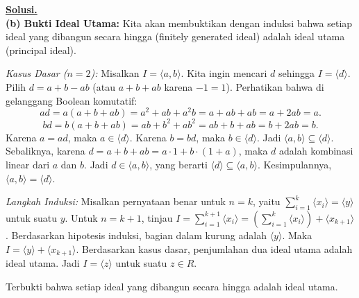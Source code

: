 \documentclass[12pt,twoside]{article}
\newenvironment{solution}
{
	\par\noindent\textbf{\underline{Solusi.}}\\
}
{
	\par
}
\begin{document}
\begin{enumerate}
\begin{solution}
          \textbf{(b) Bukti Ideal Utama:}
          Kita akan membuktikan dengan induksi bahwa setiap ideal yang dibangun secara hingga (finitely generated ideal) adalah ideal utama (principal ideal).

          \textit{Kasus Dasar ($n=2$):}
          Misalkan $I = \langle a, b \rangle$. Kita ingin mencari $d$ sehingga $I = \langle d \rangle$.
          Pilih $d = a + b - ab$ (atau $a+b+ab$ karena $-1=1$).
          Perhatikan bahwa di gelanggang Boolean komutatif:
          \[ ad = a(a+b+ab) = a^2 + ab + a^2b = a + ab + ab = a + 2ab = a. \]
          \[ bd = b(a+b+ab) = ab + b^2 + ab^2 = ab + b + ab = b + 2ab = b. \]
          Karena $a = ad$, maka $a \in \langle d \rangle$.
          Karena $b = bd$, maka $b \in \langle d \rangle$.
          Jadi $\langle a, b \rangle \subseteq \langle d \rangle$.
          Sebaliknya, karena $d = a + b + ab = a \cdot 1 + b \cdot (1+a)$, maka $d$ adalah kombinasi linear dari $a$ dan $b$.
          Jadi $d \in \langle a, b \rangle$, yang berarti $\langle d \rangle \subseteq \langle a, b \rangle$.
          Kesimpulannya, $\langle a, b \rangle = \langle d \rangle$.

          \textit{Langkah Induksi:}
          Misalkan pernyataan benar untuk $n=k$, yaitu $\sum_{i=1}^k \langle x_i \rangle = \langle y \rangle$ untuk suatu $y$.
          Untuk $n=k+1$, tinjau $I = \sum_{i=1}^{k+1} \langle x_i \rangle = \left(\sum_{i=1}^k \langle x_i \rangle\right) + \langle x_{k+1} \rangle$.
          Berdasarkan hipotesis induksi, bagian dalam kurung adalah $\langle y \rangle$.
          Maka $I = \langle y \rangle + \langle x_{k+1} \rangle$.
          Berdasarkan kasus dasar, penjumlahan dua ideal utama adalah ideal utama.
          Jadi $I = \langle z \rangle$ untuk suatu $z \in R$.

          Terbukti bahwa setiap ideal yang dibangun secara hingga adalah ideal utama.
        \end{solution}



\end{enumerate}
\end{document}
